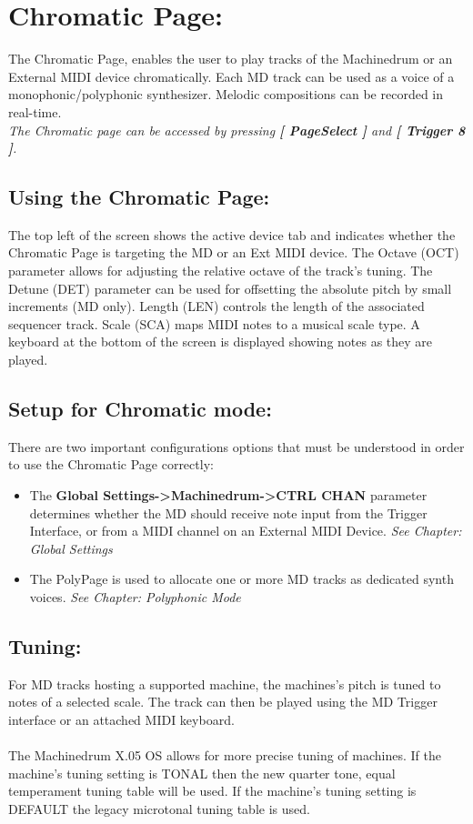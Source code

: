 \chapter{Chromatic Page:}
The Chromatic Page, enables the user to play tracks of the Machinedrum or an External MIDI device chromatically. Each MD track can be used as a voice of a monophonic/polyphonic synthesizer. Melodic compositions can be recorded in real-time.
\\
\textit{The Chromatic page can be accessed by pressing \textbf{[ PageSelect ]} and \textbf{[ Trigger 8 ]}.}
\\
\section{Using the Chromatic Page:}
The top left of the screen shows the active device tab and indicates whether the Chromatic Page is targeting the MD or an Ext MIDI device.
The Octave (OCT) parameter allows for adjusting the relative octave of the track's tuning. The Detune (DET) parameter can be used for offsetting the absolute pitch by small increments (MD only). Length (LEN) controls the length of the associated sequencer track. Scale (SCA) maps MIDI notes to a musical scale type.
A keyboard at the bottom of the screen is displayed showing notes as they are played.
\newpage
\section{Setup for Chromatic mode:}
There are two important configurations options that must be understood in order to use the Chromatic Page correctly:
\begin{itemize}
    \item The \textbf{Global Settings->Machinedrum->CTRL CHAN} parameter determines whether the MD should receive note input from the Trigger Interface, or from a MIDI channel on an External MIDI Device. \textit{See Chapter: Global Settings}
    \item The PolyPage is used to allocate one or more MD tracks as dedicated synth voices. \textit{See Chapter: Polyphonic Mode} 
\end{itemize}

\section{Tuning:}
For MD tracks hosting a supported machine, the machines’s pitch is tuned to notes of a selected scale. The track can then be played using the MD Trigger interface or an attached MIDI keyboard.\\\\
The Machinedrum X.05 OS allows for more precise tuning of machines. If the machine's tuning setting is TONAL then the new quarter tone, equal temperament tuning table will be used. If the machine's tuning setting is DEFAULT the legacy microtonal tuning table is used.
\\
